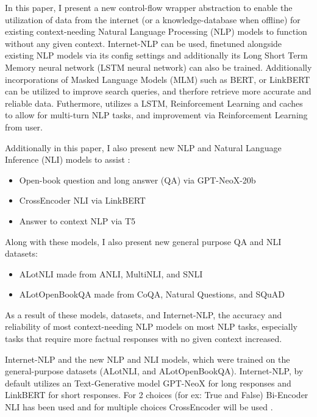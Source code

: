 In this paper, I present {\bf \inlp} a new control-flow wrapper abstraction to enable the utilization of data from the internet (or a knowledge-database when offline) for existing context-needing Natural Language Processing (NLP) models to function without any given context. Internet-NLP can be used, finetuned alongside existing NLP models via its config settings and additionally its Long Short Term Memory neural network (LSTM neural network) can also be trained. Additionally incorporations of Masked Language Models (MLM) such as BERT, or LinkBERT \cite{devlin-etal-2019-bert,yasunaga-etal-2022-linkbert} can be utilized to improve search queries, and therfore retrieve more accurate and reliable data. Futhermore, {\bf \inlp} utilizes a LSTM, Reinforcement Learning and caches to allow for multi-turn NLP tasks, and improvement via Reinforcement Learning from user.


Additionally in this paper, I also present new NLP and Natural Language Inference (NLI) models to assist {\bf \inlp}:

\begin{itemize}
    \item Open-book question and long answer (QA) via GPT-NeoX-20b \cite{gpt-neox-library, gpt-neox-20b}
    \item CrossEncoder NLI via LinkBERT \cite{reimers-2019-sentence-bert,thakur-2020-AugSBERT, yasunaga-etal-2022-linkbert}
    \item Answer to context NLP via T5 \cite{https://doi.org/10.48550/arxiv.1910.10683}
\end{itemize}

Along with these models, I also present new general purpose QA and NLI datasets:

\begin{itemize}
    \item ALotNLI made from ANLI, MultiNLI, and SNLI \cite{nie-etal-2020-adversarial,N18-1101,DBLP:journals/corr/BowmanAPM15}
    \item ALotOpenBookQA made from CoQA, Natural Questions, and SQuAD \cite{DBLP:journals/corr/abs-1808-07042,kwiatkowski-etal-2019-natural,DBLP:journals/corr/abs-1806-03822}
\end{itemize}

As a result of these models, datasets, and Internet-NLP, the accuracy and reliability of most context-needing NLP models on most NLP tasks, especially tasks that require more factual responses with no given context increased.

Internet-NLP and the new NLP and NLI models, which were trained on the general-purpose datasets (ALotNLI, and ALotOpenBookQA). Internet-NLP, by default utilizes an Text-Generative model GPT-NeoX \cite{gpt-neox-library, gpt-neox-20b} for long responses and LinkBERT \cite{yasunaga-etal-2022-linkbert} for short responses. For 2 choices (for ex: True and False) Bi-Encoder NLI has been used and for multiple choices CrossEncoder will be used \cite{thakur-2020-AugSBERT}.


